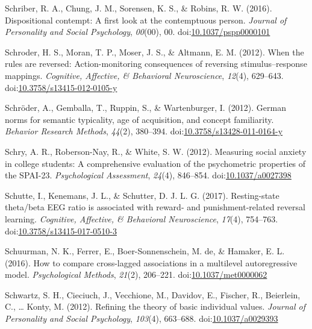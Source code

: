 \documentclass[english,man]{apa6}
\begin{document}
\hypertarget{ref-Schriber2016}{}
Schriber, R. A., Chung, J. M., Sorensen, K. S., \& Robins, R. W. (2016).
Dispositional contempt: A first look at the contemptuous person.
\emph{Journal of Personality and Social Psychology}, \emph{00}(00), 00.
doi:\href{https://doi.org/10.1037/pspp0000101}{10.1037/pspp0000101}

\hypertarget{ref-Schroder2012}{}
Schroder, H. S., Moran, T. P., Moser, J. S., \& Altmann, E. M. (2012).
When the rules are reversed: Action-monitoring consequences of reversing
stimulus--response mappings. \emph{Cognitive, Affective, \& Behavioral
Neuroscience}, \emph{12}(4), 629--643.
doi:\href{https://doi.org/10.3758/s13415-012-0105-y}{10.3758/s13415-012-0105-y}

\hypertarget{ref-Schroder2012a}{}
Schröder, A., Gemballa, T., Ruppin, S., \& Wartenburger, I. (2012).
German norms for semantic typicality, age of acquisition, and concept
familiarity. \emph{Behavior Research Methods}, \emph{44}(2), 380--394.
doi:\href{https://doi.org/10.3758/s13428-011-0164-y}{10.3758/s13428-011-0164-y}

\hypertarget{ref-Schry2012}{}
Schry, A. R., Roberson-Nay, R., \& White, S. W. (2012). Measuring social
anxiety in college students: A comprehensive evaluation of the
psychometric properties of the SPAI-23. \emph{Psychological Assessment},
\emph{24}(4), 846--854.
doi:\href{https://doi.org/10.1037/a0027398}{10.1037/a0027398}

\hypertarget{ref-Schutte2017}{}
Schutte, I., Kenemans, J. L., \& Schutter, D. J. L. G. (2017).
Resting-state theta/beta EEG ratio is associated with reward- and
punishment-related reversal learning. \emph{Cognitive, Affective, \&
Behavioral Neuroscience}, \emph{17}(4), 754--763.
doi:\href{https://doi.org/10.3758/s13415-017-0510-3}{10.3758/s13415-017-0510-3}

\hypertarget{ref-Schuurman2016}{}
Schuurman, N. K., Ferrer, E., Boer-Sonnenschein, M. de, \& Hamaker, E.
L. (2016). How to compare cross-lagged associations in a multilevel
autoregressive model. \emph{Psychological Methods}, \emph{21}(2),
206--221.
doi:\href{https://doi.org/10.1037/met0000062}{10.1037/met0000062}

\hypertarget{ref-Schwartz}{}
Schwartz, S. H., Cieciuch, J., Vecchione, M., Davidov, E., Fischer, R.,
Beierlein, C., \ldots{} Konty, M. (2012). Refining the theory of basic
individual values. \emph{Journal of Personality and Social Psychology},
\emph{103}(4), 663--688.
doi:\href{https://doi.org/10.1037/a0029393}{10.1037/a0029393}
\end{document}
